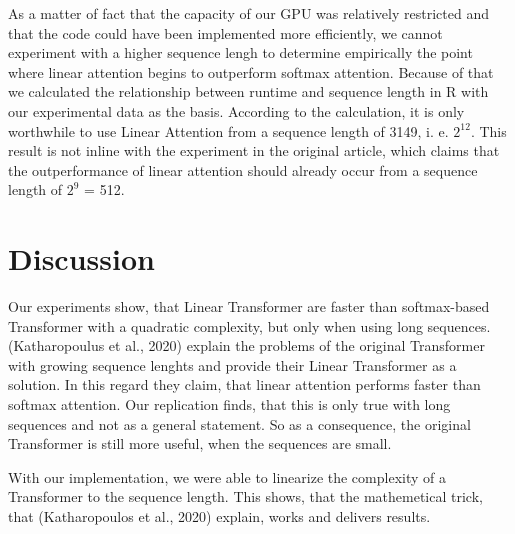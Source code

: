 \documentclass[DIV=13,fontsize=11pt]{scrartcl}
\begin{document}
As a matter of fact that the capacity of our GPU was relatively restricted and that the code could have been implemented more efficiently,  we cannot experiment with a higher sequence lengh to determine empirically the point where linear attention begins to outperform softmax attention.  Because of that we calculated the relationship between runtime and sequence length in R with our experimental data as the basis. According to the calculation, it is only worthwhile to use Linear Attention from a sequence length of 3149, i. e.  \(2^{12}\). This result is not inline with the experiment in the original article, which claims that the outperformance of linear attention should already occur from a sequence length of \(2^9\) = 512. 


\section{Discussion}
Our experiments show, that Linear Transformer are faster than softmax-based Transformer with a quadratic complexity, but only when using long sequences. (Katharopoulus et al., 2020) explain the problems of the original Transformer with growing sequence lenghts and provide their Linear Transformer as a solution. In this regard they claim, that linear attention performs faster than softmax attention. Our replication finds, that this is only true with long sequences and not as a general statement. So as a consequence, the original Transformer is still more useful, when the sequences are small. 

With our implementation, we were able to linearize the complexity of a Transformer to the sequence length. This shows, that the mathemetical trick, that (Katharopoulos et al., 2020) explain, works and delivers results. 
\end{document}
